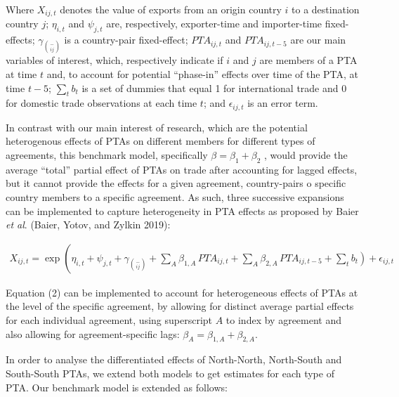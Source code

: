 \documentclass[12pt]{article}%
\begin{document}
Where \(X_{ij,t}\) denotes the value of exports from an origin country
\(i\) to a destination country \(j\); \(\eta_{i,t}\) and \(\psi_{j,t}\)
are, respectively, exporter-time and importer-time fixed-effects;
\(\gamma_{\binom{-}{ij}}\) is a country-pair fixed-effect;
\({PTA}_{ij,t}\) and \({PTA}_{ij,t - 5}\) are our main variables of
interest, which, respectively indicate if \(i\) and \(j\) are members of
a PTA at time \(t\) and, to account for potential ``phase-in'' effects
over time of the PTA, at time \(t - 5\); \(\sum_{t}^{}b_{t}\) is a set
of dummies that equal 1 for international trade and 0 for domestic trade
observations at each time \(t\); and \(\epsilon_{ij,t}\) is an error
term.

In contrast with our main interest of research, which are the potential
heterogenous effects of PTAs on different members for different types of
agreements, this benchmark model, specifically
\(\beta = \beta_{1} + \beta_{2}\) , would provide the average ``total''
partial effect of PTAs on trade after accounting for lagged effects, but
it cannot provide the effects for a given agreement, country-pairs o
specific country members to a specific agreement. As such, three
successive expansions can be implemented to capture heterogeneity in PTA
effects as proposed by Baier \emph{et al}. (Baier, Yotov, and Zylkin
2019):

\begin{multline}
    X_{ij,t} = \exp\left(\eta_{i,t} + \psi_{j,t} + \gamma_{\binom{-}{ij}} + \sum_{A} \beta_{1,A} \, PTA_{ij,t} \right. + \sum_{A} \beta_{2,A} \, PTA_{ij,t-5} + \left. \sum_{t} b_{t} \right) + \epsilon_{ij,t}
\end{multline}

Equation (2) can be implemented to account for heterogeneous effects of
PTAs at the level of the specific agreement, by allowing for distinct
average partial effects for each individual agreement, using superscript
\(A\) to index by agreement and also allowing for agreement-specific
lags: \(\beta_{A} = \beta_{1,A} + \beta_{2,A}\).

In order to analyse the differentiated effects of North-North,
North-South and South-South PTAs, we extend both models to get estimates
for each type of PTA. Our benchmark model is extended as follows:
\end{document}
